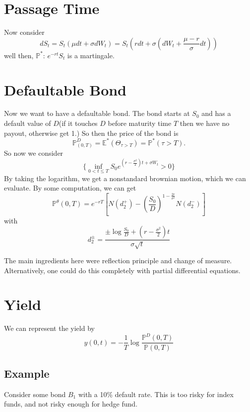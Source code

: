 \documentclass[twocolumn,openany]{book}
\begin{document}
\section{Passage Time}
Now consider
\begin{equation}
	dS_t = S_t(\mu dt + \sigma dW_t) = S_t(r dt + \sigma(dW_t + \frac{\mu-r}{\sigma}dt))
\end{equation}
well then, $\mathbb{P}^*$: $e^{-rt}S_t$ is a martingale.

\section{Defaultable Bond}
Now we want to have a defaultable bond. The bond starts at $S_0$ and has a default value of $D$(if it touches $D$ before maturity time $T$ then we have no payout, otherwise get 1.) So then the price of the bond is
\begin{equation}
	\mathbb{P}^D_{(0,T)} = \mathbb{E}^*(\Theta_{\tau > T}) = \mathbb{P}^*(\tau > T).
\end{equation}
So now we consider
\begin{equation}
	\{ \inf_{0 < t \leq T} S_0 e^{(r- \frac{\sigma^2}{2})t + \sigma W_t} > 0 \} 
\end{equation}
By taking the logarithm, we get a nonstandard brownian motion, which we can evaluate. By some computation, we can get
\begin{equation}
	\mathbb{P}^\theta(0,T) = e^{-rT}\left[ N(d_2^+) - \left(\frac{S_0}{D} \right)^{1-\frac{2r}{\sigma^2}}N(d_2^-) \right]
\end{equation}
with
\begin{equation}
	d_2^{\pm} = \frac{\pm \log \frac{S_0}{D} + \left(r - \frac{\sigma^2}{2} \right)t}{\sigma \sqrt{t}}
\end{equation}

The main ingredients here were reflection principle and change of measure. Alternatively, one could do this completely with partial differential equations.

\section{Yield}
We can represent the yield by
\begin{equation}
	y(0,t) = -\frac{1}{T}\log \frac{\mathbb{P}^D(0,T)}{\mathbb{P}(0,T)}
\end{equation}

\subsection{Example}
Consider some bond $B_1$ with a 10\% default rate. This is too risky for index funds, and not risky enough for hedge fund.
\end{document}
